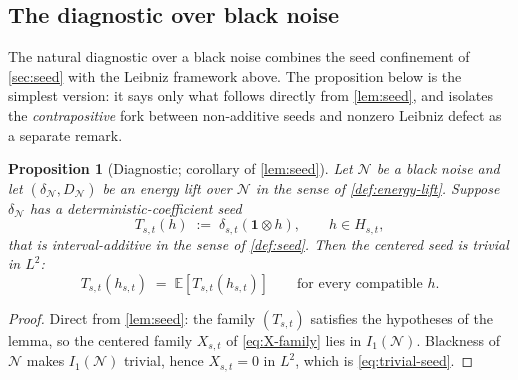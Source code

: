 \documentclass[11pt,reqno]{amsart}
\theoremstyle{plain}
\newtheorem{proposition}[theorem]{Proposition}
\theoremstyle{definition}
\theoremstyle{remark}
\newcommand{\E}{\mathbb{E}}
\begin{document}
\subsection{The diagnostic over black noise}\label{sec:leibniz-black}

The natural diagnostic over a black noise combines the seed
confinement of \cref{sec:seed} with the Leibniz framework above. The
proposition below is the simplest version: it says only what
follows directly from \cref{lem:seed}, and isolates the
\emph{contrapositive} fork between non-additive seeds and nonzero
Leibniz defect as a separate remark.

\begin{proposition}[Diagnostic; corollary of \cref{lem:seed}]\label{prop:diagnostic}
Let $\mathcal N$ be a black noise and let
$(\delta_{\mathcal N},D_{\mathcal N})$ be an energy lift over
$\mathcal N$ in the sense of \cref{def:energy-lift}. Suppose
$\delta_{\mathcal N}$ has a deterministic-coefficient seed
\[
  T_{s,t}(h)\;:=\;\delta_{s,t}(\mathbf 1\otimes h),\qquad h\in H_{s,t},
\]
that is interval-additive in the sense of \cref{def:seed}. Then the
centered seed is trivial in $L^2$:
\begin{equation}\label{eq:trivial-seed}
  T_{s,t}(h_{s,t})\;=\;\E[T_{s,t}(h_{s,t})]\qquad\text{for every compatible }h.
\end{equation}
\end{proposition}

\begin{proof}
Direct from \cref{lem:seed}: the family $(T_{s,t})$ satisfies the
hypotheses of the lemma, so the centered family $X_{s,t}$ of
\eqref{eq:X-family} lies in $I_1(\mathcal N)$. Blackness of
$\mathcal N$ makes $I_1(\mathcal N)$ trivial, hence
$X_{s,t}=0$ in $L^2$, which is \eqref{eq:trivial-seed}.
\end{proof}
\end{document}
